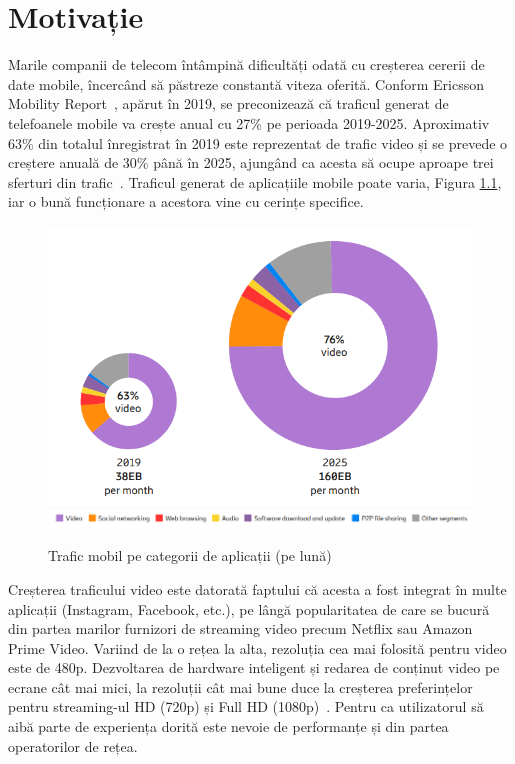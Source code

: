 \documentclass[12pt,a4paper]{report}
\begin{document}
\chapter{Motivație}
Marile companii de telecom întâmpină dificultăți odată cu creșterea cererii de date mobile, încercând să păstreze constantă viteza oferită. Conform Ericsson Mobility Report~\cite{ericsson_mobility_report}, apărut în 2019, se preconizează că traficul generat de telefoanele mobile va crește anual cu 27\% pe perioada 2019-2025. Aproximativ 63\% din totalul înregistrat în 2019 este reprezentat de trafic video și se prevede o creștere anuală de 30\% până în 2025, ajungând ca acesta să ocupe aproape trei sferturi din trafic~\cite{ericsson_mobility_report}. Traficul generat de aplicațiile mobile poate varia, Figura \ref{fig:tipuri_de_trafic}, iar o bună funcționare a acestora vine cu cerințe specifice.

\begin{figure}[th]
\centering
\includegraphics[width=\linewidth]{img/tipuri_de_trafic.png}
\includegraphics[width=\linewidth]{img/tipuri_de_trafic_legenda.png}
\caption{Trafic mobil pe categorii de aplicații (pe lună)~\cite{ericsson_mobility_report}\protect}
\label{fig:tipuri_de_trafic}
\end{figure}

Creșterea traficului video este datorată faptului că acesta a fost integrat în multe aplicații (Instagram, Facebook, etc.), pe lângă popularitatea de care se bucură din partea marilor furnizori de streaming video precum Netflix sau Amazon Prime Video. Variind de la o rețea la alta, rezoluția cea mai folosită pentru video este de 480p. Dezvoltarea de hardware inteligent și redarea de conținut video pe ecrane cât mai mici, la rezoluții cât mai bune duce la creșterea preferințelor pentru streaming-ul HD (720p) și Full HD (1080p)~\cite{ericsson_mobility_report}. Pentru ca utilizatorul să aibă parte de experiența dorită este nevoie de performanțe și din partea operatorilor de rețea.
\end{document}
